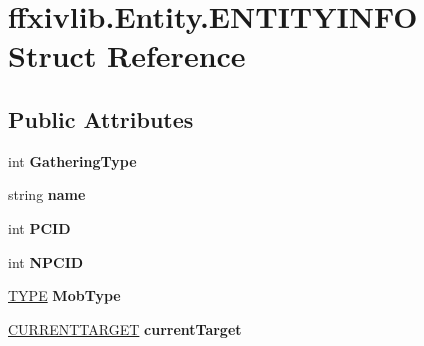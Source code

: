 \hypertarget{structffxivlib_1_1_entity_1_1_e_n_t_i_t_y_i_n_f_o}{\section{ffxivlib.\-Entity.\-E\-N\-T\-I\-T\-Y\-I\-N\-F\-O Struct Reference}
\label{structffxivlib_1_1_entity_1_1_e_n_t_i_t_y_i_n_f_o}
}
\subsection*{Public Attributes}
\begin{DoxyCompactItemize}
\item 
\hypertarget{structffxivlib_1_1_entity_1_1_e_n_t_i_t_y_i_n_f_o_a179e48b58b038509c996fd001b630450}{int {\bfseries Gathering\-Type}}\label{structffxivlib_1_1_entity_1_1_e_n_t_i_t_y_i_n_f_o_a179e48b58b038509c996fd001b630450}

\item 
\hypertarget{structffxivlib_1_1_entity_1_1_e_n_t_i_t_y_i_n_f_o_afa81612dd1f40544b2bc987c0d224413}{string {\bfseries name}}\label{structffxivlib_1_1_entity_1_1_e_n_t_i_t_y_i_n_f_o_afa81612dd1f40544b2bc987c0d224413}

\item 
\hypertarget{structffxivlib_1_1_entity_1_1_e_n_t_i_t_y_i_n_f_o_af4340fb1575aed1491d220b0996277e3}{int {\bfseries P\-C\-I\-D}}\label{structffxivlib_1_1_entity_1_1_e_n_t_i_t_y_i_n_f_o_af4340fb1575aed1491d220b0996277e3}

\item 
\hypertarget{structffxivlib_1_1_entity_1_1_e_n_t_i_t_y_i_n_f_o_a201031ed99104aa84eddcacdfa0276c7}{int {\bfseries N\-P\-C\-I\-D}}\label{structffxivlib_1_1_entity_1_1_e_n_t_i_t_y_i_n_f_o_a201031ed99104aa84eddcacdfa0276c7}

\item 
\hypertarget{structffxivlib_1_1_entity_1_1_e_n_t_i_t_y_i_n_f_o_a42fd66513e50082589fa96b06b8bb5ca}{\hyperlink{namespaceffxivlib_aaa4e86d1ea6dbc1661147e6616256e68}{T\-Y\-P\-E} {\bfseries Mob\-Type}}\label{structffxivlib_1_1_entity_1_1_e_n_t_i_t_y_i_n_f_o_a42fd66513e50082589fa96b06b8bb5ca}

\item 
\hypertarget{structffxivlib_1_1_entity_1_1_e_n_t_i_t_y_i_n_f_o_ace1351810603910b7d8793c513e805ba}{\hyperlink{namespaceffxivlib_a027fd426531e3a42243f5c2b946dde31}{C\-U\-R\-R\-E\-N\-T\-T\-A\-R\-G\-E\-T} {\bfseries current\-Target}}\label{structffxivlib_1_1_entity_1_1_e_n_t_i_t_y_i_n_f_o_ace1351810603910b7d8793c513e805ba}


\end{DoxyCompactItemize}
